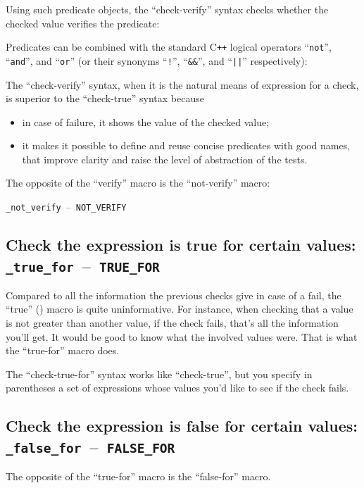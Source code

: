 \documentclass[twoside, a4paper, article]{memoir}
\newcommand*\testudocolor{\color{red!80!blue}}
\newcommand*\testudo[1]{\texttt{\testudocolor{}#1}}
\newcommand*\testudopair[2]{\testudo{#1}~--~\testudo{#2}}
\newcommand\subsectiontestudopair[3]{%
  \subsection[#1]{#1: \testudopair{#2}{#3}}}
\providecommand\typesetexample[1]{%
}
\newcommand*\Cpp{C\texttt{++}}
\begin{document}
Using such predicate objects, the ``check-verify'' syntax checks whether the
checked value verifies the predicate:

\typesetexample{verify}

Predicates can be combined with the standard \Cpp{} logical operators
``\texttt{not}'', ``\texttt{and}'', and ``\texttt{or}'' (or their synonyms
``\texttt{!}'', ``\texttt{\&\&}'', and ``\texttt{||}'' respectively):

\typesetexample{verify-logical-ops}

The ``check-verify'' syntax, when it is the natural means of expression for a
check, is superior to the ``check-true'' syntax because
\begin{itemize}
\item in case of failure, it shows the value of the checked value;
\item it makes it possible to define and reuse concise predicates with good
  names, that improve clarity and raise the level of abstraction of the tests.
\end{itemize}

The opposite of the ``verify'' macro is the ``not-verify'' macro:
\begin{center}
  \testudopair{\_not\_verify}{NOT\_VERIFY}
\end{center}

\subsectiontestudopair{Check the expression is true for certain values}%
{\_true\_for}{TRUE\_FOR}
\label{sec:check-expression-true-for}

Compared to all the information the previous checks give in case of a fail, the
``true'' () macro is quite uninformative.  For
instance, when checking that a value is not greater than another value, if the
check fails, that's all the information you'll get.  It would be good to know
what the involved values were.  That is what the ``true-for'' macro does.

The ``check-true-for'' syntax works like ``check-true'', but you specify in
parentheses a set of expressions whose values you'd like to see if the check
fails.

\typesetexample{check-true-for}

\subsectiontestudopair{Check the expression is false for certain values}%
{\_false\_for}{FALSE\_FOR}
\label{sec:check-expression-false-for}

The opposite of the ``true-for'' macro is the ``false-for'' macro.

\typesetexample{check-false-for}
\end{document}
